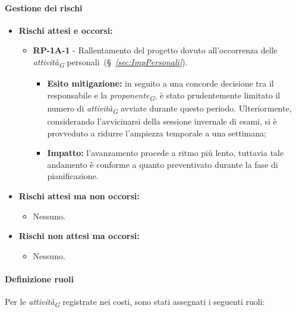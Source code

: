 \paragraph{Gestione dei rischi} 
\begin{itemize}
    \item \textbf{Rischi attesi e occorsi:}
\begin{itemize}
    \item \textbf{RP-1A-1} - Rallentamento del progetto dovuto all'occorrenza delle \textit{attività}\textsubscript{\textit{G}} personali~(\S~\textit{\ref{sec:ImpPersonali}}).
    \begin{itemize}
        \item \textbf{Esito mitigazione:} 
        in seguito a una concorde decisione tra il responsabile e la \textit{proponente}\textsubscript{\textit{G}}, è stato prudentemente limitato il numero di \textit{attività}\textsubscript{\textit{G}} avviate durante questo periodo. Ulteriormente, considerando l'avvicinarsi della sessione invernale di esami, si è provveduto a ridurre l'ampiezza temporale a una settimana;
        \item \textbf{Impatto:}
        l'avanzamento procede a ritmo più lento, tuttavia tale andamento è conforme a quanto preventivato durante la fase di pianificazione.
    \end{itemize}
\end{itemize}
\item \textbf{Rischi attesi ma non occorsi:}
 \begin{itemize}
    \item Nessuno.
\end{itemize}
\item \textbf{Rischi non attesi ma occorsi:}
\begin{itemize}
    \item Nessuno.
\end{itemize}
\end{itemize}

\paragraph{Definizione ruoli}
Per le \textit{attività}\textsubscript{\textit{G}} registrate nei costi, sono stati assegnati i seguenti ruoli:

\vspace{0.4cm}

